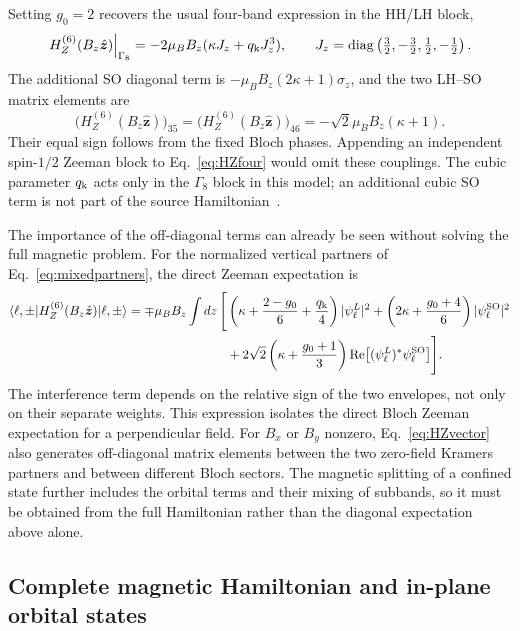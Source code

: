 Setting $g_0=2$ recovers the usual four-band expression in the HH/LH block,
\begin{equation}
\left.H_Z^{(6)}(B_z\hat{\bm z})\right|_{\Gamma_8}
=-2\mu_BB_z(\kappa J_z+q_{\mathrm k} J_z^3),
\qquad
J_z=\operatorname{diag}\left(\tfrac32,-\tfrac32,\tfrac12,-\tfrac12\right).
\label{eq:HZfour}
\end{equation}
The additional SO diagonal term is $-\mu_BB_z(2\kappa+1)\sigma_z$, and the two LH--SO matrix elements are
\begin{equation}
\bigl(H_Z^{(6)}(B_z\hat{\bm z})\bigr)_{35}=\bigl(H_Z^{(6)}(B_z\hat{\bm z})\bigr)_{46}
=-\sqrt2\mu_BB_z(\kappa+1).
\label{eq:HZmixing}
\end{equation}
Their equal sign follows from the fixed Bloch phases. Appending an independent spin-$1/2$ Zeeman block to Eq.~\eqref{eq:HZfour} would omit these couplings. The cubic parameter $q_{\mathrm k}$ acts only in the $\Gamma_8$ block in this model; an additional cubic SO term is not part of the source Hamiltonian~\cite{delvecchio2026}.

The importance of the off-diagonal terms can already be seen without solving the full magnetic problem. For the normalized vertical partners of Eq.~\eqref{eq:mixedpartners}, the direct Zeeman expectation is
\begin{align}
\langle \ell,\pm\rvert H_Z^{(6)}(B_z\hat{\bm z})\lvert \ell,\pm\rangle
=\mp\mu_BB_z\int dz\,\Bigg[&
\left(\kappa+\frac{2-g_0}{6}+\frac{q_{\mathrm k}}{4}\right)|\psi_\ell^L|^2
+\left(2\kappa+\frac{g_0+4}{6}\right)|\psi_\ell^{\mathrm{SO}}|^2\nonumber\\
&+2\sqrt2\left(\kappa+\frac{g_0+1}{3}\right)
\operatorname{Re}\bigl[(\psi_\ell^L)^*\psi_\ell^{\mathrm{SO}}\bigr]
\Bigg].
\label{eq:directZeeman}
\end{align}
The interference term depends on the relative sign of the two envelopes, not only on their separate weights. This expression isolates the direct Bloch Zeeman expectation for a perpendicular field. For $B_x$ or $B_y$ nonzero, Eq.~\eqref{eq:HZvector} also generates off-diagonal matrix elements between the two zero-field Kramers partners and between different Bloch sectors. The magnetic splitting of a confined state further includes the orbital terms and their mixing of subbands, so it must be obtained from the full Hamiltonian rather than the diagonal expectation above alone.

\subsection{Complete magnetic Hamiltonian and in-plane orbital states}

